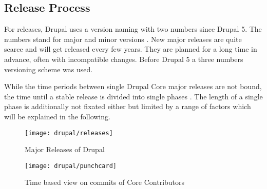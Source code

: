 
\subsection{Release Process} %
\label{sub:Release Process}

For releases, Drupal uses a version naming with two numbers since Drupal 5. The
numbers stand for major and minor versions \cite{DrupalUpgrade}. New major
releases are quite scarce and will get released every few years. They are
planned for a long time in advance, often with incompatible changes. Before
Drupal 5 a three numbers versioning scheme was used.

While the time periods between single Drupal Core major releases are not bound,
the time until a stable release is divided into single phases
\cite{DrupalReleaseCycle}. The length of a single phase is additionally not
fixated either but limited by a range of factors which will be explained in the
following.

\begin{figure}[htbp]
  \centering
  \texttt{[image: drupal/releases]}
  \caption{Major Releases of Drupal}
\end{figure}

\begin{figure}[htbp]
  \centering
  \texttt{[image: drupal/punchcard]}
  \caption{Time based view on commits of Core Contributors}
\end{figure}

